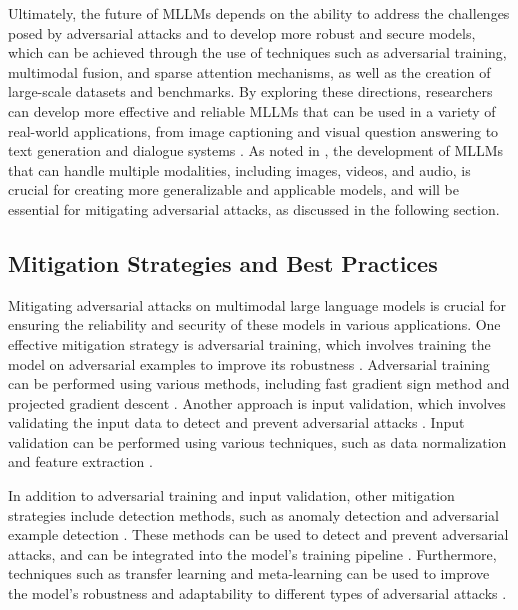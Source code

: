 \documentclass[11pt,a4paper]{article}
\begin{document}
Ultimately, the future of MLLMs depends on the ability to address the challenges posed by adversarial attacks and to develop more robust and secure models, which can be achieved through the use of techniques such as adversarial training, multimodal fusion, and sparse attention mechanisms, as well as the creation of large-scale datasets and benchmarks. By exploring these directions, researchers can develop more effective and reliable MLLMs that can be used in a variety of real-world applications, from image captioning and visual question answering to text generation and dialogue systems \cite{arxiv:2408.11039}. As noted in \cite{arxiv:2404.11865}, the development of MLLMs that can handle multiple modalities, including images, videos, and audio, is crucial for creating more generalizable and applicable models, and will be essential for mitigating adversarial attacks, as discussed in the following section.


\subsection{Mitigation Strategies and Best Practices}


Mitigating adversarial attacks on multimodal large language models is crucial for ensuring the reliability and security of these models in various applications. One effective mitigation strategy is adversarial training, which involves training the model on adversarial examples to improve its robustness \cite{arxiv:1411.2539}. Adversarial training can be performed using various methods, including fast gradient sign method and projected gradient descent \cite{arxiv:2305.17216}. Another approach is input validation, which involves validating the input data to detect and prevent adversarial attacks \cite{arxiv:2407.15272}. Input validation can be performed using various techniques, such as data normalization and feature extraction \cite{arxiv:2307.08041}.

In addition to adversarial training and input validation, other mitigation strategies include detection methods, such as anomaly detection and adversarial example detection \cite{arxiv:2212.08044}. These methods can be used to detect and prevent adversarial attacks, and can be integrated into the model's training pipeline \cite{doi:10.1109/bigdata59044.2023.10386743}. Furthermore, techniques such as transfer learning and meta-learning can be used to improve the model's robustness and adaptability to different types of adversarial attacks \cite{arxiv:2401.13601}.
\end{document}

